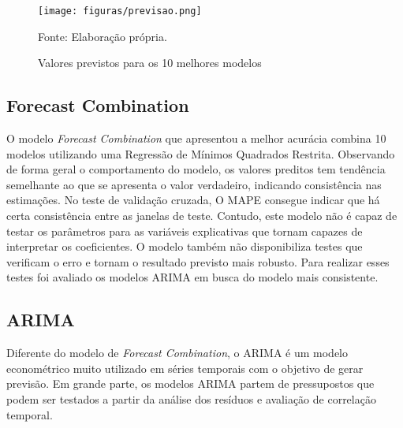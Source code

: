 \documentclass[
article, %
12pt, %
oneside, %
a4paper, %
portuguese, %
portuguese %
]{abntex2}
\begin{document}
\begin{figure}[H]
    \centering
    \caption{Valores previstos para os 10 melhores modelos}
    \texttt{[image: figuras/previsao.png]}
    \begin{flushleft}
    Fonte: Elaboração própria.
    \end{flushleft}
    \label{fig:05}
\end{figure}

\subsection{Forecast Combination}

O modelo \textit{Forecast Combination} que apresentou a melhor acurácia combina 10 modelos utilizando uma Regressão de Mínimos Quadrados Restrita. Observando de forma geral o comportamento do modelo, os valores preditos tem tendência semelhante ao que se apresenta o valor verdadeiro, indicando consistência nas estimações. No teste de validação cruzada, O MAPE consegue indicar que há certa consistência entre as janelas de teste. Contudo, este modelo não é capaz de testar os parâmetros para as variáveis explicativas que tornam capazes de interpretar os coeficientes. O modelo também não disponibiliza testes que verificam o erro e tornam o resultado previsto mais robusto. Para realizar esses testes foi avaliado os modelos ARIMA em busca do modelo mais consistente.







\subsection{ARIMA}

Diferente do modelo de \textit{Forecast Combination}, o ARIMA é um modelo econométrico muito utilizado em séries temporais com o objetivo de gerar previsão. Em grande parte, os modelos ARIMA partem de pressupostos que podem ser testados a partir da análise dos resíduos e avaliação de correlação temporal.


\end{document}
